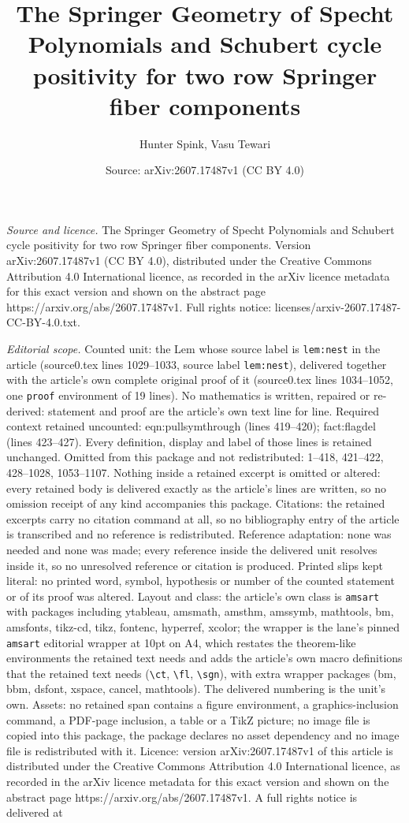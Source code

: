 \documentclass[10pt,a4paper]{amsart}
\title[The Springer Geometry of Specht Polynomials and Schubert cyc]{The Springer Geometry of Specht Polynomials and Schubert cycle positivity for two row Springer fiber components}
\author{Hunter Spink, Vasu Tewari}
\date{Source: arXiv:2607.17487v1 (CC BY 4.0)}
\begin{document}
\maketitle

\noindent\emph{Source and licence.} The Springer Geometry of Specht Polynomials and Schubert cycle positivity for two row Springer fiber components. Version arXiv:2607.17487v1 (CC BY 4.0), distributed under the Creative Commons Attribution 4.0 International licence, as recorded in the arXiv licence metadata for this exact version and shown on the abstract page https://arxiv.org/abs/2607.17487v1. Full rights notice: licenses/arxiv-2607.17487-CC-BY-4.0.txt.\par\smallskip

\noindent\textit{Editorial scope.} Counted unit: the Lem whose source label is \texttt{lem:nest} in the article (source0.tex lines 1029--1033, source label \texttt{lem:nest}), delivered together with the article's own complete original proof of it (source0.tex lines 1034--1052, one \texttt{proof} environment of 19 lines). No mathematics is written, repaired or re-derived: statement and proof are the article's own text line for line. Required context retained uncounted: eqn:pullsymthrough (lines 419--420); fact:flagdel (lines 423--427). Every definition, display and label of those lines is retained unchanged. Omitted from this package and not redistributed: 1--418, 421--422, 428--1028, 1053--1107. Nothing inside a retained excerpt is omitted or altered: every retained body is delivered exactly as the article's lines are written, so no omission receipt of any kind accompanies this package. Citations: the retained excerpts carry no citation command at all, so no bibliography entry of the article is transcribed and no reference is redistributed. Reference adaptation: none was needed and none was made; every reference inside the delivered unit resolves inside it, so no unresolved reference or citation is produced. Printed slips kept literal: no printed word, symbol, hypothesis or number of the counted statement or of its proof was altered. Layout and class: the article's own class is \texttt{amsart} with packages including ytableau, amsmath, amsthm, amssymb, mathtools, bm, amsfonts, tikz-cd, tikz, fontenc, hyperref, xcolor; the wrapper is the lane's pinned \texttt{amsart} editorial wrapper at 10pt on A4, which restates the theorem-like environments the retained text needs and adds the article's own macro definitions that the retained text needs (\texttt{\textbackslash ct}, \texttt{\textbackslash fl}, \texttt{\textbackslash sgn}), with extra wrapper packages (bm, bbm, dsfont, xspace, cancel, mathtools). The delivered numbering is the unit's own. Assets: no retained span contains a figure environment, a graphics-inclusion command, a PDF-page inclusion, a table or a TikZ picture; no image file is copied into this package, the package declares no asset dependency and no image file is redistributed with it. Licence: version arXiv:2607.17487v1 of this article is distributed under the Creative Commons Attribution 4.0 International licence, as recorded in the arXiv licence metadata for this exact version and shown on the abstract page https://arxiv.org/abs/2607.17487v1. A full rights notice is delivered at 
\end{document}
